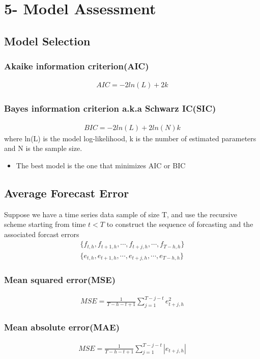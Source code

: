 \documentclass{article}
\theoremstyle{definition}
\theoremstyle{thrm}
\theoremstyle{lma}
\theoremstyle{ppst}
\theoremstyle{crlr}
\begin{document}
\section{5- Model Assessment}
\subsection{Model Selection}
\subsubsection{Akaike information criterion(AIC)}
\begin{align*}
	AIC = -2ln(L)+2k
\end{align*}
\subsubsection{Bayes information criterion a.k.a Schwarz IC(SIC) }
\begin{align*}
	BIC = -2ln(L)+2ln(N)k
\end{align*}
where ln(L) is the model log-likelihood, k is the number of estimated parameters and N is the sample size. 
\begin{itemize}
	\item The best model is the one that minimizes AIC or BIC
\end{itemize}
\subsection{Average Forecast Error}
Suppose we have a time series data sample of size T, and use the recursive scheme starting from time $t<T$ to construct the sequence of forcasting and the associated forcast errors
\begin{align*}
	\{f_{t,h},f_{t+1,h},\cdots, f_{t+j,h},\cdots, f_{T-h,h}\}\\
	\{e_{t,h},e_{t+1,h},\cdots, e_{t+j,h},\cdots, e_{T-h,h}\}
\end{align*}
\subsubsection{Mean squared error(MSE)}
\begin{align*}
	MSE = \frac{1}{T-h-t+1}\sum_{j=1}^{T-j-t}e_{t+j,h}^2
\end{align*}
\subsubsection{Mean absolute error(MAE)}
\begin{align*}
	MSE = \frac{1}{T-h-t+1}\sum_{j=1}^{T-j-t}|e_{t+j,h}|
\end{align*}
\end{document}
